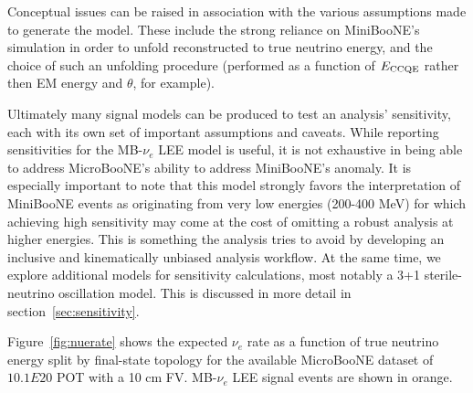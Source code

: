 \documentclass[a4paper]{article}
\begin{document}
Conceptual issues can be raised in association with the various assumptions made to generate the model. These include the strong reliance on MiniBooNE's simulation in order to unfold reconstructed to true neutrino energy, and the choice of such an unfolding procedure (performed as a function of $E_{\rm CCQE}$ rather then EM energy and $\theta$, for example).
\par Ultimately many signal models can be produced to test an analysis' sensitivity, each with its own set of important assumptions and caveats. While reporting sensitivities for the MB-$\nu_e$ LEE model is useful, it is not exhaustive in being able to address MicroBooNE's ability to address MiniBooNE's anomaly. It is especially important to note that this model strongly favors the interpretation of MiniBooNE events as originating from very low energies (200-400 MeV) for which achieving high sensitivity may come at the cost of omitting a robust analysis at higher energies. This is something the analysis tries to avoid by developing an inclusive and kinematically unbiased analysis workflow. At the same time, we explore additional models for sensitivity calculations, most notably a 3+1 sterile-neutrino oscillation model. This is discussed in more detail in section~\ref{sec:sensitivity}.
\par Figure~\ref{fig:nuerate} shows the expected $\nu_e$ rate as a function of true neutrino energy split by final-state topology for the available MicroBooNE dataset of $10.1E20$ POT with a 10 cm FV. MB-$\nu_e$ LEE signal events are shown in orange.
\end{document}
